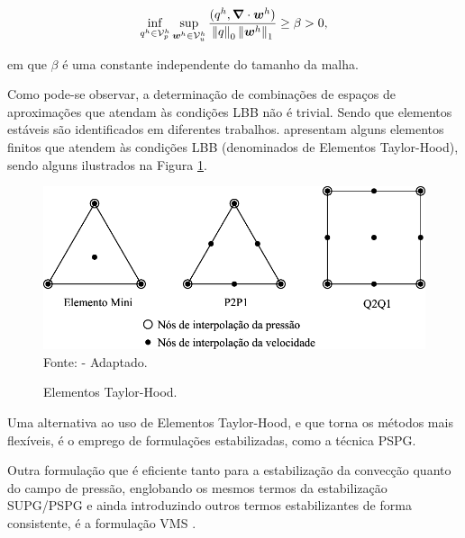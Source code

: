 \begin{equation}
    \inf_{q^h\in\mathcal{V}_p^h}{\sup_{\boldsymbol{w}^h\in\mathcal{V}_u^h}{\frac{(q^h,\boldsymbol{\nabla}\cdot\boldsymbol{w}^h)}{\left\lVert{q}\right\lVert_0\left\lVert{\boldsymbol{w}^h}\right\lVert_1}}}\geq\beta>0\text{,}
\end{equation}

\noindent em que $\beta$ é uma constante independente do tamanho da malha.

Como pode-se observar, a determinação de combinações de espaços de aproximações que atendam às condições LBB não é trivial. Sendo que elementos estáveis são identificados em diferentes trabalhos.  apresentam alguns elementos finitos que atendem às condições LBB (denominados de Elementos Taylor-Hood), sendo alguns ilustrados na Figura \ref{fig:Taylor-Hood}.

\begin{figure}[h!]
    \centering
    \caption{Elementos Taylor-Hood.}
    \includegraphics[width=.65\linewidth]{Figuras/Taylor-Hood.pdf}
    \\Fonte:  - Adaptado.
    \label{fig:Taylor-Hood}
\end{figure}

Uma alternativa ao uso de Elementos Taylor-Hood, e que torna os métodos mais flexíveis, é o emprego de formulações estabilizadas, como a técnica PSPG.

Outra formulação que é eficiente tanto para a estabilização da convecção quanto do campo de pressão, englobando os mesmos termos da estabilização SUPG/PSPG e ainda introduzindo outros termos estabilizantes de forma consistente, é a formulação VMS \cite{bazilevs2013computational}.




